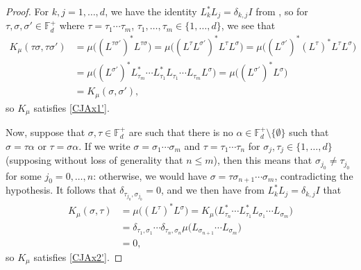\documentclass[11pt,reqno]{amsart}
\def\a{\alpha}
\def\s{\sigma}
\def\t{\tau}
\def\d{\delta}
\def\FF{\mathbb{F}}
\theoremstyle{definition}
\numberwithin{equation}{section}
\begin{document}
\begin{proof}
    For \(k,j = 1, \ldots, d\), we have the identity \(L_k^*L_j = \d_{k,j} I\) from \cite{JM22a}, so for \(\t,\s,\s' \in \FF_d^+\) where \(\t = \t_1\cdots\t_m\), \(\t_1, \ldots, \t_m \in \{1, \ldots, d\}\), we see that
    \begin{align*}
        K_{\mu}(\t\s, \t\s') & = \mu\big((L^{\t\s'})^*L^{\t\s}\big) = \mu\big( (L^{\t}L^{\s'})^* L^{\t}L^{\s}\big) = \mu\big( (L^{\s'})^* (L^{\t})^* L^{\t} L^{\s}\big) \\
        & = \mu\big( (L^{\s'})^* L_{\t_m}^* \cdots L_{\t_1}^* L_{\t_1} \cdots L_{\t_m} L^{\s}\big) = \mu\big( (L^{\s'})^* L^{\s}\big) \\
        & = K_{\mu}(\s, \s'),
    \end{align*}
    so \(K_\mu\) satisfies \eqref{CJAx1'}.

    Now, suppose that \(\s,\t \in \FF_d^+\) are such that there is no \(\a \in \FF_d^+\setminus\{\emptyset\}\) such that \(\s = \t\a\) or \(\t = \s\a\). If we write \(\s = \s_1 \cdots \s_m\) and \(\t = \t_1\cdots\t_n\) for \(\s_j,\t_j \in \{1, \ldots, d\}\) (supposing without loss of generality that \(n \leq m\)), then this means that \(\s_{j_0} \neq \t_{j_0}\) for some \(j_0 = 0, \ldots, n\): otherwise, we would have \(\s = \t \s_{n+1}\cdots\s_{m}\), contradicting the hypothesis. It follows that \(\d_{\t_{j_0},\s_{j_0}} = 0\), and we then have from \(L_k^*L_j = \d_{k,j} I\) that
    \begin{align*}
        K_{\mu}(\s,\t) & = \mu \big((L^\t)^*L^\s\big) = K_{\mu}\big( L_{\t_n}^*\cdots L_{\t_1}^* L_{\s_1} \cdots L_{\s_m}\big) \\
        & = \d_{\t_1,\s_1}\cdots \d_{\t_n,\s_n}\mu\big( L_{\s_{n+1}} \cdots L_{\s_m}\big) \\
        & = 0,
    \end{align*}
    so \(K_\mu\) satisfies \eqref{CJAx2'}.


\end{proof}
\end{document}
